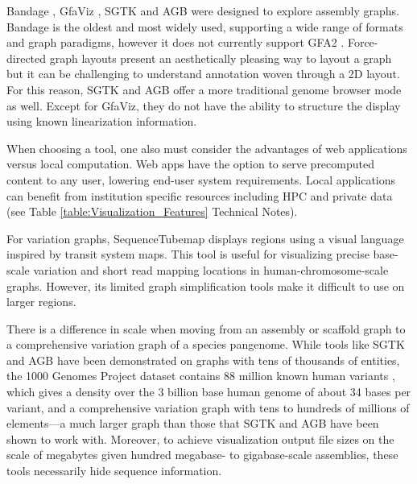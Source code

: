 Bandage \cite{Wick_2015}, GfaViz \cite{Gonnella_2018}, SGTK \cite{Kunyavskaya_2018} and AGB \cite{Mikheenko_2019} were designed to explore assembly graphs.
Bandage is the oldest and most widely used, supporting a wide range of formats and graph  paradigms, however it does not currently support GFA2 \citep{Mikheenko_2019}.
Force-directed graph layouts present an aesthetically pleasing way to layout a graph but it can be challenging to understand annotation woven through a 2D layout.
For this reason, SGTK and AGB offer a more traditional genome browser mode as well.
Except for GfaViz, they do not have the ability to structure the display using known linearization information. 

When choosing a tool, one also must consider the advantages of web applications versus local computation.  
Web apps have the option to serve precomputed content to any user, lowering end-user system requirements.
Local applications can benefit from institution specific resources including HPC and private data (see Table \ref{table:Visualization_Features} Technical Notes).

For variation graphs, SequenceTubemap \cite{Beyer_2019} displays regions using a visual language inspired by transit system maps.
This tool is useful for visualizing precise base-scale variation and short read mapping locations in human-chromosome-scale graphs.
However, its limited graph simplification tools make it difficult to use on larger regions.

There is a difference in scale when moving from an assembly or scaffold graph to a comprehensive variation graph of a species pangenome.
While tools like SGTK and AGB have been demonstrated on graphs with tens of thousands of entities, the 1000 Genomes Project dataset contains 88 million known human variants \citep{1000_2015}, which gives a density over the 3 billion base human genome of about 34 bases per variant, and a comprehensive variation graph with tens to hundreds of millions of elements---a much larger graph than those that SGTK and AGB have been shown to work with.
Moreover, to achieve visualization output file sizes on the scale of megabytes given hundred megabase- to gigabase-scale assemblies, these tools necessarily hide sequence information.



